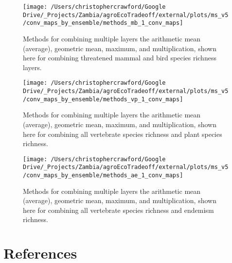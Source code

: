 \documentclass[
]{article}
\begin{document}
\begin{figure}
\texttt{[image: /Users/christophercrawford/Google Drive/\_Projects/Zambia/agroEcoTradeoff/external/plots/ms\_v5/conv\_maps\_by\_ensemble/methods\_mb\_1\_conv\_maps]} \caption{Methods for combining multiple layers the arithmetic mean (average), geometric mean, maximum, and multiplication, shown here for combining threatened mammal and bird species richness layers.}\label{fig:conv-maps-methods-mb-1}
\end{figure}

\begin{figure}
\texttt{[image: /Users/christophercrawford/Google Drive/\_Projects/Zambia/agroEcoTradeoff/external/plots/ms\_v5/conv\_maps\_by\_ensemble/methods\_vp\_1\_conv\_maps]} \caption{Methods for combining multiple layers the arithmetic mean (average), geometric mean, maximum, and multiplication, shown here for combining all vertebrate species richness and plant species richness.}\label{fig:conv-maps-methods-vp-1}
\end{figure}

\begin{figure}
\texttt{[image: /Users/christophercrawford/Google Drive/\_Projects/Zambia/agroEcoTradeoff/external/plots/ms\_v5/conv\_maps\_by\_ensemble/methods\_ae\_1\_conv\_maps]} \caption{Methods for combining multiple layers the arithmetic mean (average), geometric mean, maximum, and multiplication, shown here for combining all vertebrate species richness and endemism richness.}\label{fig:conv-maps-methods-ae-1}
\end{figure}

\newpage

\hypertarget{references}{%
\section*{References}\label{references}}
\end{document}
